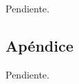 \documentclass[a4paper,10pt,twoside]{article}
\begin{document}
Pendiente.



\newpage

\begin{appendices}

\section{Apéndice}

Pendiente.


\end{appendices}
\end{document}
